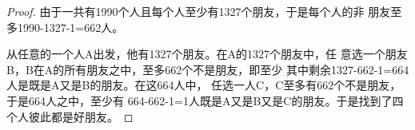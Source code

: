 \begin{proof}
   由于一共有1990个人且每个人至少有1327个朋友，于是每个人的非
   朋友至多1990-1327-1=662人。

   从任意的一个人A出发，他有1327个朋友。在A的1327个朋友中，任
   意选一个朋友B，B在A的所有朋友之中，至多662个不是朋友，即至少
   其中剩余1327-662-1=664人是既是A又是B的朋友。在这664人中，
   任选一人C，C至多有662个不是朋友，于是664人之中，至少有
   664-662-1=1人既是A又是B又是C的朋友。于是找到了四个人彼此都是好朋友。
\end{proof}